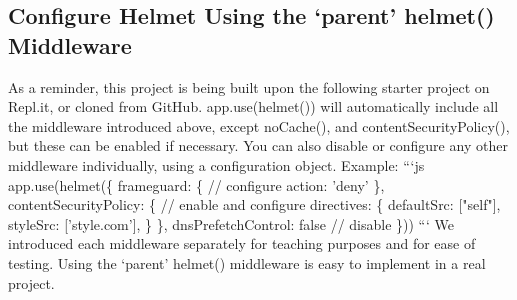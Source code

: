 \documentclass{article}%
\begin{document}
\subsection{Configure Helmet Using the ‘parent’ helmet() Middleware}%
\label{subsec:ConfigureHelmetUsingtheparenthelmet()Middleware}%
As a reminder, this project is being built upon the following starter project on Repl.it, or cloned from GitHub.\newline%
app.use(helmet()) will automatically include all the middleware introduced above, except noCache(), and contentSecurityPolicy(), but these can be enabled if necessary. You can also disable or configure any other middleware individually, using a configuration object.\newline%
Example:\newline%
```js\newline%
app.use(helmet(\{\newline%
  frameguard: \{         // configure\newline%
    action: 'deny'\newline%
  \},\newline%
  contentSecurityPolicy: \{    // enable and configure\newline%
    directives: \{\newline%
      defaultSrc: {[}"self"{]},\newline%
      styleSrc: {[}'style.com'{]},\newline%
    \}\newline%
  \},\newline%
  dnsPrefetchControl: false     // disable\newline%
\}))\newline%
```\newline%
We introduced each middleware separately for teaching purposes and for ease of testing. Using the ‘parent’ helmet() middleware is easy to implement in a real project.\newline%

%
\end{document}
